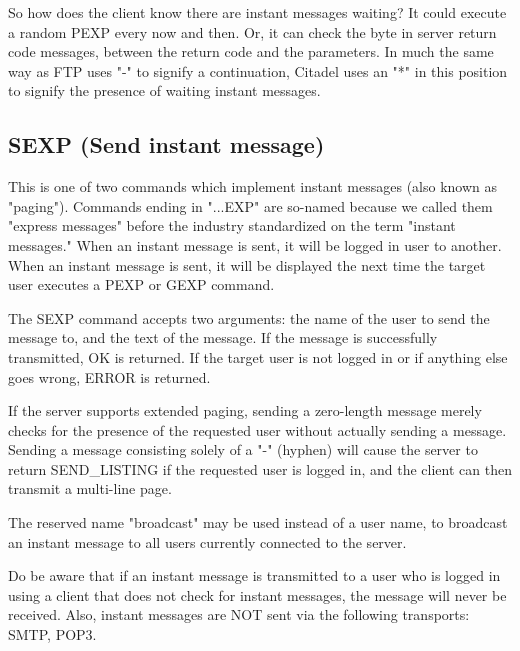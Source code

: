  So how does the client know there are instant messages waiting?  It could
execute a random PEXP every now and then.  Or, it can check the byte in
server return code messages, between the return code and the parameters.  In
much the same way as FTP uses "-" to signify a continuation, Citadel uses
an "*" in this position to signify the presence of waiting instant messages.



\subsection{SEXP (Send instant message)}

 This is one of two commands which implement instant messages (also known
as "paging").  Commands ending in "...EXP" are so-named because we called
them "express messages" before the industry standardized on the term
"instant messages."  When an instant message is sent, it will be
logged in user to another.  When an instant message is sent, it will be
displayed the next time the target user executes a PEXP or GEXP command.

 The SEXP command accepts two arguments: the name of the user to send the
message to, and the text of the message.  If the message is successfully
transmitted, OK is returned.  If the target user is not logged in or if
anything else goes wrong, ERROR is returned.

 If the server supports extended paging, sending a zero-length message
merely checks for the presence of the requested user without actually sending
a message.  Sending a message consisting solely of a "-" (hyphen) will cause
the server to return SEND_LISTING if the requested user is logged in, and the
client can then transmit a multi-line page.

 The reserved name "broadcast" may be used instead of a user name, to
broadcast an instant message to all users currently connected to the server.

 Do be aware that if an instant message is transmitted to a user who is logged
in using a client that does not check for instant messages, the message will
never be received.  Also, instant messages are NOT sent via the following
transports:  SMTP, POP3.



